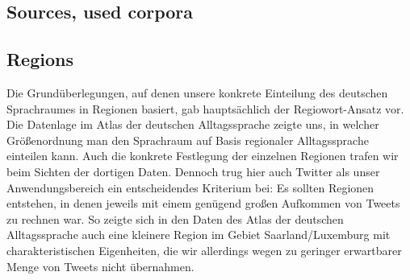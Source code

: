 \documentclass[../Main.tex]{subfiles}
\begin{document}
\subsection{Sources, used corpora}
\subsection{Regions}
Die Grundüberlegungen, auf denen unsere konkrete Einteilung des deutschen Sprachraumes in Regionen basiert, gab hauptsächlich der Regiowort-Ansatz vor. Die Datenlage im Atlas der deutschen Alltagssprache zeigte uns, in welcher Größenordnung man den Sprachraum auf Basis regionaler Alltagssprache einteilen kann. Auch die konkrete Festlegung der einzelnen Regionen trafen wir beim Sichten der dortigen Daten. Dennoch trug hier auch Twitter als unser Anwendungsbereich ein entscheidendes Kriterium bei: Es sollten Regionen entstehen, in denen jeweils mit einem genügend großen Aufkommen von Tweets zu rechnen war. So zeigte sich in den Daten des Atlas der deutschen Alltagssprache auch eine kleinere Region im Gebiet Saarland/Luxemburg mit charakteristischen Eigenheiten, die wir allerdings wegen zu geringer erwartbarer Menge von Tweets nicht übernahmen.
\end{document}

